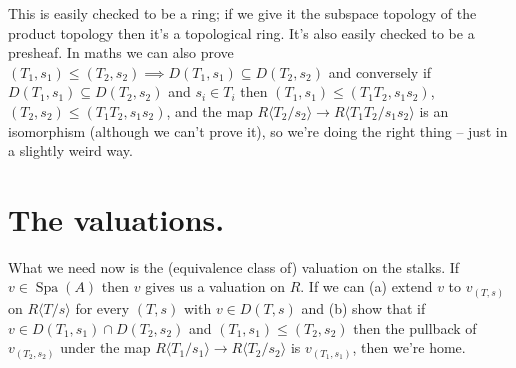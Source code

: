 \documentclass{amsart}
\DeclareMathOperator{\Spa}{Spa}
\theoremstyle{plain}
\theoremstyle{remark}
\begin{document}
This is easily checked to be a ring; if we give it the subspace topology of the product topology then it's a topological ring. It's also easily checked to be a presheaf. In maths we can also prove $(T_1,s_1)\leq(T_2,s_2)\implies D(T_1,s_1)\subseteq D(T_2,s_2)$ and conversely if $D(T_1,s_1)\subseteq D(T_2,s_2)$ and $s_i\in T_i$ then $(T_1,s_1)\leq (T_1T_2,s_1s_2)$, $(T_2,s_2)\leq (T_1T_2,s_1s_2)$, and the map $R\langle T_2/s_2\rangle \to R\langle T_1T_2/s_1s_2\rangle$ is an isomorphism (although we can't prove it), so we're doing the right thing -- just in a slightly weird way.

\section{The valuations.}

What we need now is the (equivalence class of) valuation on the stalks. If $v\in\Spa(A)$ then $v$ gives us a valuation on $R$. If we can (a) extend $v$ to $v_{(T,s)}$ on $R\langle T/s\rangle$ for every $(T,s)$ with $v\in D(T,s)$ and (b) show that if $v\in D(T_1,s_1)\cap D(T_2,s_2)$ and $(T_1,s_1)\leq (T_2,s_2)$ then the pullback of $v_{(T_2,s_2)}$ under the map $R\langle T_1/s_1\rangle\to R\langle T_2/s_2\rangle$ is $v_{(T_1,s_1)}$, then we're home.
\end{document}
